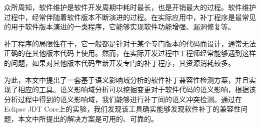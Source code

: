 

\begin{cabstract} 
	众所周知，软件维护是软件开发周期中耗时最长，也是开销最大的过程。软件维护过程中，经常伴随着软件版本不断演进的过程。在实际应用中，补丁程序是最常见的用于软件版本演进的一类程序，它能够实现软件功能增强、漏洞修复等。
	
	补丁程序的局限性在于，它一般都是针对于某个专门版本的代码而设计，通常无法正确的在其他版本代码上使用。然而，在实际开发过程中工程师经常能够遇到这样的问题，如果对其他版本代码重新开发专门的补丁程序，其资源消耗较多。
	
	为此，本文中提出了一套基于语义影响域分析的软件补丁兼容性检测方案，并且实现了相应的工具。语义影响域分析可以挖掘变更对于软件代码的语义影响，根据该分析过程中得到的语义影响域，我们能够进行补丁间的语义冲突检测。通过在Eclipse JDT Core上的实验，我们发现该工具确实能够发现软件补丁的兼容性问题，本文中所提出的解决方案是可用的、可靠的。
\end{cabstract}
